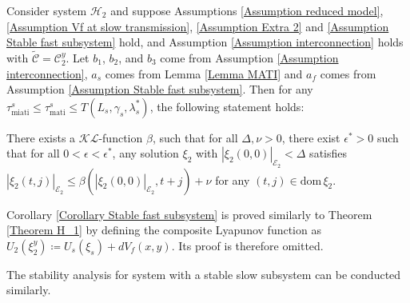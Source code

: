 \begin{cor}
    Consider system $\mathcal{H}_2$ and suppose Assumptions \ref{Assumption reduced model}, \ref{Assumption Vf at slow transmission}, \ref{Assumption Extra 2} and \ref{Assumption Stable fast subsystem} hold, and Assumption \ref{Assumption interconnection} holds with $\widetilde{\mathcal{C}} =  \mathcal{C}_2^y$.
    Let $b_1$, $b_2$, and $b_3$ come from Assumption \ref{Assumption interconnection}, $a_s$ comes from Lemma \ref{Lemma MATI} and $a_f$ comes from Assumption \ref{Assumption Stable fast subsystem}. Then for any $\tau_{\text{miati}}^s \leq \tau_{\text{mati}}^s \leq T(L_s, \gamma_s, \lambda_s^*)$, the following statement holds:

    There exists a $\mathcal{KL}$-function $\beta$, such that for all $\Delta, \nu>0$, there exist $\epsilon^* >0$ such that for all $0<\epsilon<\epsilon^*$, any solution $\xi_2$ with $ |\xi_2(0,0)|_{\mathcal{E}_2}<\Delta$ satisfies $|\xi_2(t,j)|_{\mathcal{E}_2} \leq \beta(|\xi_2(0,0)|_{\mathcal{E}_2}, t+j) + \nu$ for any $(t,j)\in \text{dom} \, \xi_2$.
    \label{Corollary Stable fast subsystem}
\end{cor}
Corollary \ref{Corollary Stable fast subsystem} is proved similarly to Theorem \ref{Theorem H_1} by defining the composite Lyapunov function as $U_2(\xi_2^y)\coloneqq {U_s}(\xi_s) + d{V_f}(x,y)$. Its proof is therefore omitted.
\begin{rem}
    The stability analysis for system with a stable slow subsystem can be conducted similarly.
\end{rem}

















